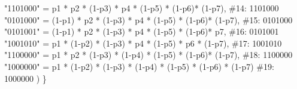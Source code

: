 \documentclass[
  letterpaper,
  DIV=11,
  numbers=noendperiod]{scrartcl}
\newenvironment{Shaded}{\begin{snugshade}}{\end{snugshade}}
\newcommand{\CommentTok}[1]{\textcolor[rgb]{0.37,0.37,0.37}{#1}}
\newcommand{\DecValTok}[1]{\textcolor[rgb]{0.68,0.00,0.00}{#1}}
\newcommand{\NormalTok}[1]{\textcolor[rgb]{0.00,0.23,0.31}{#1}}
\newcommand{\OtherTok}[1]{\textcolor[rgb]{0.00,0.23,0.31}{#1}}
\newcommand{\SpecialCharTok}[1]{\textcolor[rgb]{0.37,0.37,0.37}{#1}}
\newcommand{\StringTok}[1]{\textcolor[rgb]{0.13,0.47,0.30}{#1}}
\begin{document}
\begin{Shaded}
\begin{Highlighting}[]
          \StringTok{"1101000"} \OtherTok{=}\NormalTok{ p1 }\SpecialCharTok{*}\NormalTok{ p2 }\SpecialCharTok{*}\NormalTok{ (}\DecValTok{1}\SpecialCharTok{{-}}\NormalTok{p3) }\SpecialCharTok{*}\NormalTok{ p4 }\SpecialCharTok{*}\NormalTok{ (}\DecValTok{1}\SpecialCharTok{{-}}\NormalTok{p5) }\SpecialCharTok{*}\NormalTok{ (}\DecValTok{1}\SpecialCharTok{{-}}\NormalTok{p6)}\SpecialCharTok{*}\NormalTok{ (}\DecValTok{1}\SpecialCharTok{{-}}\NormalTok{p7),            }\CommentTok{\#14: 1101000}
          \StringTok{"0101000"} \OtherTok{=}\NormalTok{ (}\DecValTok{1}\SpecialCharTok{{-}}\NormalTok{p1) }\SpecialCharTok{*}\NormalTok{ p2 }\SpecialCharTok{*}\NormalTok{ (}\DecValTok{1}\SpecialCharTok{{-}}\NormalTok{p3) }\SpecialCharTok{*}\NormalTok{ p4 }\SpecialCharTok{*}\NormalTok{ (}\DecValTok{1}\SpecialCharTok{{-}}\NormalTok{p5) }\SpecialCharTok{*}\NormalTok{ (}\DecValTok{1}\SpecialCharTok{{-}}\NormalTok{p6)}\SpecialCharTok{*}\NormalTok{ (}\DecValTok{1}\SpecialCharTok{{-}}\NormalTok{p7),        }\CommentTok{\#15: 0101000}
          \StringTok{"0101001"} \OtherTok{=}\NormalTok{ (}\DecValTok{1}\SpecialCharTok{{-}}\NormalTok{p1) }\SpecialCharTok{*}\NormalTok{ p2 }\SpecialCharTok{*}\NormalTok{ (}\DecValTok{1}\SpecialCharTok{{-}}\NormalTok{p3) }\SpecialCharTok{*}\NormalTok{ p4 }\SpecialCharTok{*}\NormalTok{ (}\DecValTok{1}\SpecialCharTok{{-}}\NormalTok{p5) }\SpecialCharTok{*}\NormalTok{ (}\DecValTok{1}\SpecialCharTok{{-}}\NormalTok{p6)}\SpecialCharTok{*}\NormalTok{ p7,            }\CommentTok{\#16: 0101001}
          \StringTok{"1001010"} \OtherTok{=}\NormalTok{ p1 }\SpecialCharTok{*}\NormalTok{ (}\DecValTok{1}\SpecialCharTok{{-}}\NormalTok{p2) }\SpecialCharTok{*}\NormalTok{ (}\DecValTok{1}\SpecialCharTok{{-}}\NormalTok{p3) }\SpecialCharTok{*}\NormalTok{ p4 }\SpecialCharTok{*}\NormalTok{ (}\DecValTok{1}\SpecialCharTok{{-}}\NormalTok{p5) }\SpecialCharTok{*}\NormalTok{ p6 }\SpecialCharTok{*}\NormalTok{ (}\DecValTok{1}\SpecialCharTok{{-}}\NormalTok{p7),           }\CommentTok{\#17: 1001010}
          \StringTok{"1100000"} \OtherTok{=}\NormalTok{ p1 }\SpecialCharTok{*}\NormalTok{ p2 }\SpecialCharTok{*}\NormalTok{ (}\DecValTok{1}\SpecialCharTok{{-}}\NormalTok{p3) }\SpecialCharTok{*}\NormalTok{ (}\DecValTok{1}\SpecialCharTok{{-}}\NormalTok{p4) }\SpecialCharTok{*}\NormalTok{ (}\DecValTok{1}\SpecialCharTok{{-}}\NormalTok{p5) }\SpecialCharTok{*}\NormalTok{ (}\DecValTok{1}\SpecialCharTok{{-}}\NormalTok{p6)}\SpecialCharTok{*}\NormalTok{ (}\DecValTok{1}\SpecialCharTok{{-}}\NormalTok{p7),        }\CommentTok{\#18: 1100000}
          \StringTok{"1000000"} \OtherTok{=}\NormalTok{ p1 }\SpecialCharTok{*}\NormalTok{ (}\DecValTok{1}\SpecialCharTok{{-}}\NormalTok{p2) }\SpecialCharTok{*}\NormalTok{ (}\DecValTok{1}\SpecialCharTok{{-}}\NormalTok{p3) }\SpecialCharTok{*}\NormalTok{ (}\DecValTok{1}\SpecialCharTok{{-}}\NormalTok{p4) }\SpecialCharTok{*}\NormalTok{ (}\DecValTok{1}\SpecialCharTok{{-}}\NormalTok{p5) }\SpecialCharTok{*}\NormalTok{ (}\DecValTok{1}\SpecialCharTok{{-}}\NormalTok{p6) }\SpecialCharTok{*}\NormalTok{ (}\DecValTok{1}\SpecialCharTok{{-}}\NormalTok{p7)    }\CommentTok{\#19: 1000000}
\NormalTok{    )}
\NormalTok{\}}



\end{Highlighting}
\end{Shaded}
\end{document}
